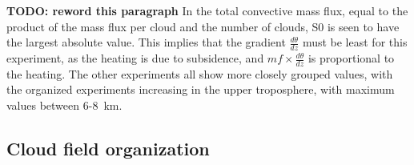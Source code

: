 \documentclass[11pt,a4paper]{article}
\newcommand\todo[1]{\textbf{TODO: #1}}
\begin{document}

\todo{reword this paragraph}
In the total convective mass flux, equal to the product of the mass flux per cloud and the number of clouds, S0 is seen to have the largest absolute value. This implies that the gradient $\frac{d \theta}{dz}$ must be least for this experiment, as the heating is due to subsidence, and $mf \times \frac{d \theta}{dz}$ is proportional to the heating. The other experiments all show more closely grouped values, with the organized experiments increasing in the upper troposphere, with maximum values between \SI{6}{}-\SI{8}{km}. 

\subsection{Cloud field organization}
\end{document}

